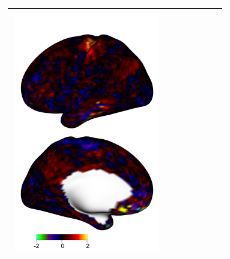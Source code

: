 \documentclass{article}
\begin{document}
\begin{tabularx}{7in}{|m{1em}|X|X|X|X|}
		\includegraphics[width=1.5in]{plots/601_single_subject_classical_right_hand.png} \\ \hline
	\end{tabularx}
	
	\newpage
	
\end{document}
